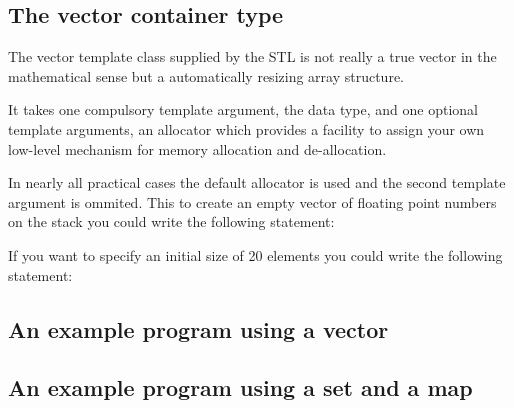 
\subsection{The vector container type}

The vector template class supplied by the STL is not really a true vector
in the mathematical sense but a automatically resizing array structure.

It takes one compulsory template argument, the data type, and one optional 
template arguments, an allocator which provides a facility to assign
your own low-level mechanism for memory allocation and de-allocation.


In nearly all practical cases the default allocator is used and the second
template argument is ommited. This to create an empty vector of floating 
point numbers on the stack you could write the following statement:


If you want to specify an initial size of 20 elements you could write the 
following statement:



\subsection{An example program using a vector}

\noindent{\small }



\subsection{An example program using a set and a map}

\noindent{\small }
